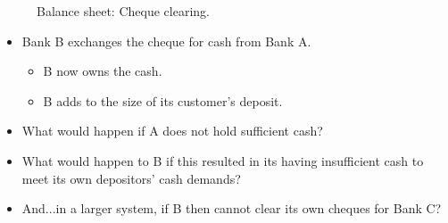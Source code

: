 \documentclass[20pt]{article}
\begin{document}
\begin{center}
\begin{figure}[H]
\begin{center}
\begin{tikzpicture}[auto, node distance=3cm,scale=(9/10),>=latex']

\end{tikzpicture}
\end{center}
\caption{Balance sheet: Cheque clearing.}
\end{figure}
\end{center}
\begin{itemize}
    \item Bank B exchanges the cheque for cash from Bank A.
    \begin{itemize}
        \item B now owns the cash.
        \item B adds to the size of its customer's deposit.
    \end{itemize}
    \item What would happen if A does not hold sufficient cash?
    \item What would happen to B if this resulted in its having insufficient cash to meet its own depositors' cash demands?
    \item And...in a larger system, if B then cannot clear its own cheques for Bank C?
\end{itemize}

\begin{print}
\newpage
\end{print}
\end{document}
